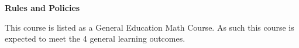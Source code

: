\documentclass[12pt]{article}
\renewcommand{\emph}[1]{\textsf{\textbf{#1}}}
\newcommand{\localhead}[1]{\par\smallskip\textbf{#1}\nobreak\\}%
\def\heading#1{\localhead{\large\emph{#1}}}
\def\subheading#1{\localhead{\emph{#1}}}
\newenvironment{clist}%
{\bgroup\parskip 0pt\begin{list}{$\bullet$}{\partopsep 4pt\topsep 0pt\itemsep -2pt}}%
{\end{list}\egroup}%
\begin{document}
\heading{Rules and Policies}
\vskip -20pt



This course is listed as a General Education Math Course. As such this course is expected to meet the 4 general learning outcomes. 
\end{document}

